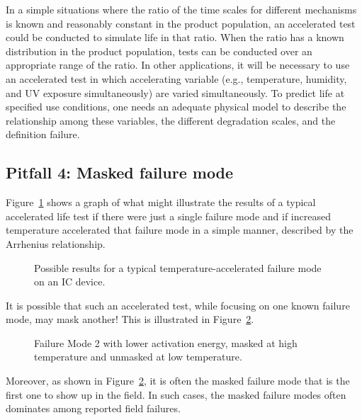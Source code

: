 In a simple situations where the ratio of the time scales for
different mechanisms is known and reasonably constant in the product
population, an accelerated test could be conducted to simulate life
in that ratio.  When the ratio has a known distribution in the
product population, tests can be conducted over an appropriate range
of the ratio. In other applications, it will be necessary to use an
accelerated test in which accelerating variable (e.g., temperature,
humidity, and UV exposure simultaneously) are varied
simultaneously. To predict life at specified use conditions, one
needs an adequate physical model to describe the relationship among
these variables, the different degradation scales, and the
definition failure.

\subsection{Pitfall 4: Masked failure mode}
\label{:section.masked.failure.mode}
Figure~\ref{figure:masked.failure.mode.ps} shows a graph of what
might illustrate the results of a typical accelerated life test
if there were just a single failure mode and if
increased temperature accelerated that failure mode in a simple
manner, described by the Arrhenius relationship.
\begin{figure}
\caption{Possible results for a typical temperature-accelerated failure
mode on an IC device.}
\label{figure:masked.failure.mode.ps}
\end{figure}
It is possible that such an
accelerated test, while focusing on one known failure mode, 
may mask another!
This is illustrated in Figure~\ref{figure:unmasked.failure.mode.ps}.
\begin{figure}
\caption{Failure Mode 2 with lower activation energy, masked at high
temperature and unmasked at low temperature.}
\label{figure:unmasked.failure.mode.ps}
\end{figure}
Moreover, as shown in Figure~\ref{figure:unmasked.failure.mode.ps},
it is often the masked failure mode that is the first one to show up
in the field. In such cases, the masked failure modes often
dominates among reported field failures.

